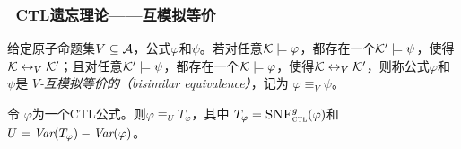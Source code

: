 \documentclass[aspectratio=1610, 9pt, CJK]{beamer}
\begin{document}
\begin{frame}
	\frametitle{~CTL遗忘理论——{\footnotesize 互模拟等价}}
	{\footnotesize
		\begin{definition}\label{def:bisimular:equivalene}
			给定原子命题集$V\subseteq {\cal A}$，公式$\varphi$和$\psi$。若对任意${\cal K}\models \varphi$，都存在一个${\cal K}'\models\psi$，使得${\cal K}\leftrightarrow_V{\cal K}'$；且对任意${\cal K}'\models\psi$，都存在一个${\cal K}\models \varphi$，使得${\cal K}\leftrightarrow_V{\cal K}'$，则称公式$\varphi$和 $\psi$是 {\em $V$-互模拟等价的（bisimilar equivalence）}，记为 $\varphi\equiv_V\psi$。
		\end{definition}
		\pause
		\begin{proposition}\label{prop:transform:V:EQ}
			令 $\varphi$为一个CTL公式。则$\varphi\equiv_UT_\varphi$，其中 $T_\varphi={\textsc{SNF}_{\textsc{ctl}}^g}(\varphi)$和
			$U=\textit{Var}(T_\varphi)-\textit{Var}(\varphi)$。
		\end{proposition}
	}
\end{frame}
\end{document}
